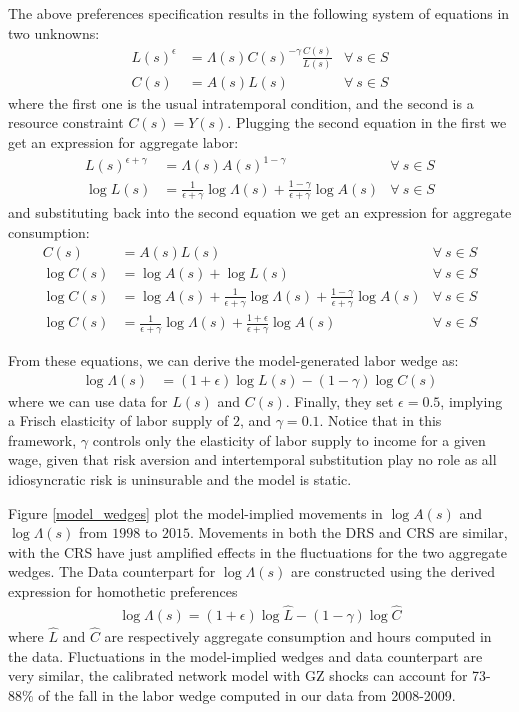 \documentclass[english,letter,11pt,twoside]{article}
\begin{document}
The above preferences specification results in the following system of equations in two unknowns:
\begin{align*}
L(s)^{\epsilon} &= \Lambda(s) C(s)^{-\gamma} \frac{C(s)}{L(s)} & \forall \ s \in S \\
C(s) &= A(s) L(s) & \forall \ s \in S
\end{align*}
where the first one is the usual intratemporal condition, and the second is a resource constraint $C(s) = Y(s)$. Plugging the second equation in the first we get an expression for aggregate labor:
\begin{align*}
L(s)^{\epsilon + \gamma} &= \Lambda(s) A(s)^{1 - \gamma} & \forall \ s \in S \\
\log L(s) &= \frac{1}{\epsilon + \gamma} \log \Lambda (s) + \frac{1 - \gamma}{\epsilon + \gamma} \log A(s) & \forall \ s \in S
\end{align*}
and substituting back into the second equation we get an expression for aggregate consumption:
\begin{align*}
C(s) &= A(s) L(s) & \forall \ s \in S \\
\log C(s) &= \log A(s) + \log L(s) & \forall \ s \in S \\
\log C(s) &= \log A(s) + \frac{1}{\epsilon + \gamma} \log \Lambda (s) + \frac{1 - \gamma}{\epsilon + \gamma} \log A(s) & \forall \ s \in S \\
\log C(s) &= \frac{1}{\epsilon + \gamma} \log \Lambda (s) + \frac{1 + \epsilon}{\epsilon + \gamma} \log A(s) & \forall \ s \in S 
\end{align*}

From these equations, we can derive the model-generated labor wedge as:
\begin{align*}
\log \Lambda (s) &= \left( 1 + \epsilon \right) \log L(s) - \left( 1 -\gamma \right) \log C(s)
\end{align*}
where we can use data for $L(s)$ and $C(s)$. Finally, they set $\epsilon = 0.5$, implying a Frisch elasticity of labor supply of $2$, and $\gamma = 0.1$. Notice that in this framework, $\gamma$ controls only the elasticity of labor supply to income for a given wage, given that risk aversion and intertemporal substitution play no role as all idiosyncratic risk is uninsurable and the model is static.

Figure \ref{model_wedges} plot the model-implied movements in $\log A(s)$ and $\log \Lambda (s)$ from $1998$ to $2015$. Movements in both the DRS and CRS are similar, with the CRS have just amplified effects in the fluctuations for the two aggregate wedges. The Data counterpart for $\log \Lambda (s)$ are constructed using the derived expression for homothetic preferences 
\begin{align*}
\log \Lambda (s) = \left( 1 + \epsilon \right) \log \hat{L} - \left( 1 -\gamma \right) \log \hat{C} 
\end{align*}
where $\hat{L}$ and $\hat{C}$ are respectively aggregate consumption and hours computed in the data. Fluctuations in the model-implied wedges and data counterpart are very similar, the calibrated network model with GZ shocks can account for 73-88\% of the fall in the labor wedge computed in our data from 2008-2009.
\end{document}
